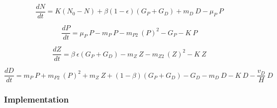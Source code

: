 \documentclass[journal abbreviation, manuscript]{copernicus}
\begin{document}
\begin{equation}
    \frac{d N}{d t} = 
    K (N_0 - N) %
    + \beta(1 - \epsilon)(G_P + G_D) %
    + m_D \ D %
    - \mu_{P} \ P %
\end{equation}

\begin{equation}
    \frac{d P}{d t} =
    \mu_{P} \ P  %
    - m_P \ P %
    - m_{P2} \ (P)^2 %
    - G_P %
    - K \ P %
\end{equation}

\begin{equation}
    \frac{d Z}{d t} =
    \beta \ \epsilon(G_P + G_D) %
    - m_Z \ Z %
    - m_{Z2} \ (Z)^2 %
    - K \ Z %
\end{equation}

\begin{equation}
    \frac{d D}{d t} = 
    m_P \ P %
    + m_{P2} \ (P)^2 %
    + m_Z \ Z %
    + (1 - \beta)(G_P + G_D) %
    - G_D %
    - m_D \ D %
    - K \ D %
    - \frac{v_D}{H} \ D %
\end{equation}


\subsubsection{Implementation}
\end{document}
